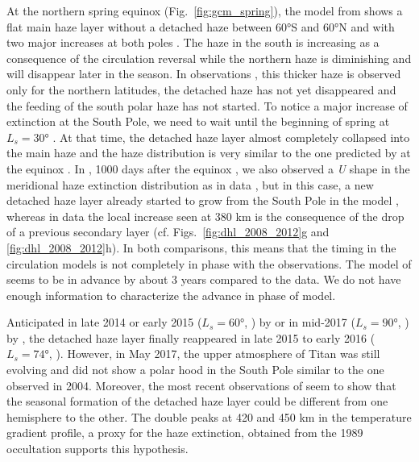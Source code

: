 At the northern spring equinox (Fig.~\ref{fig:gcm_spring}), the model from \cite{Lebonnois2012} shows a
flat main haze layer without a detached haze between \ang{60}S and \ang{60}N and with two major increases at both poles .
The haze in the south is increasing as a consequence of the circulation reversal while the northern haze is diminishing
and will disappear later in the season. In observations ,
this thicker haze is observed only for the northern latitudes, the detached haze has not yet disappeared
and the feeding of the south polar haze has not started. To notice a major increase of extinction at the South Pole,
we need to wait until the beginning of spring at $L_s = \ang{30}$ .
At that time, the detached haze layer almost completely collapsed into the main haze and the haze distribution is very
similar to the one predicted by \cite{Lebonnois2012} at the equinox .
In \cite{Larson2015}, 1000 days after the equinox , we also observed a \emph{U} shape in the meridional haze extinction distribution as in data , but in this case, a new detached haze layer already started to grow from the South Pole in the model , whereas in data  the local increase seen at 380 km is the consequence of the drop of a previous secondary layer (cf. Figs.~\ref{fig:dhl_2008_2012}g and \ref{fig:dhl_2008_2012}h).
In both comparisons, this means that the timing in the circulation models is not completely in phase with the observations.
The model of \cite{Lebonnois2012} seems to be in advance by about 3 years compared to the data.
We do not have enough information to characterize the advance in phase of \cite{Larson2015} model.

Anticipated in late 2014 or early 2015 ($L_s = \ang{60}$, ) by \cite{Larson2015} or in mid-2017 ($L_s = \ang{90}$, ) by \cite{Lebonnois2012}, the detached haze layer
finally reappeared in late 2015 to early 2016 ($L_s = \ang{74}$, ).
However, in May 2017, the upper atmosphere of Titan was still evolving and did not show a polar hood in the South Pole
similar to the one observed in 2004. Moreover, the most recent observations of  seem to show that the seasonal
formation of the detached haze layer could be different from one hemisphere to the other. The double peaks at
420 and 450 km in the temperature gradient profile, a proxy for the haze extinction, obtained from the 1989
occultation \citep{Sicardy1999} supports this hypothesis.

